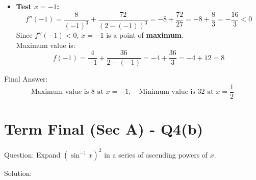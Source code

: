 \documentclass[11pt, a4paper]{article}
\begin{document}
\begin{description}
\begin{itemize}
        \item \textbf{Test $x = -1$:}
        \[ f''(-1) = \frac{8}{(-1)^3} + \frac{72}{(2 - (-1))^3} = -8 + \frac{72}{27} = -8 + \frac{8}{3} = -\frac{16}{3} < 0 \]
        Since $f''(-1) < 0$, $x = -1$ is a point of \textbf{maximum}.\\
        Maximum value is:
        \[ f(-1) = \frac{4}{-1} + \frac{36}{2 - (-1)} = -4 + \frac{36}{3} = -4 + 12 = 8 \]
    \end{itemize}
\end{description}

Final Answer:
\[ 
\boxed{\text{Maximum value is } 8 \text{ at } x = -1, \quad \text{Minimum value is } 32 \text{ at } x = \frac{1}{2}} 
\]



\section*{Term Final (Sec A) - Q4(b)}

Question:
Expand $(\sin^{-1} x)^2$ in a series of ascending powers of $x$.

Solution:
\end{document}
